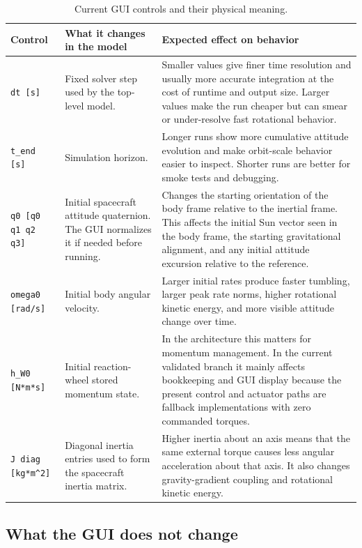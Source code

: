\documentclass[11pt]{article}
\begin{document}
\begin{table}[H]
\centering
\begin{tabularx}{\textwidth}{@{}lY Y@{}}
\toprule
\textbf{Control} & \textbf{What it changes in the model} & \textbf{Expected effect on behavior} \\
\midrule
\texttt{dt [s]} & Fixed solver step used by the top-level model. & Smaller values give finer time resolution and usually more accurate integration at the cost of runtime and output size. Larger values make the run cheaper but can smear or under-resolve fast rotational behavior. \\
\texttt{t\_end [s]} & Simulation horizon. & Longer runs show more cumulative attitude evolution and make orbit-scale behavior easier to inspect. Shorter runs are better for smoke tests and debugging. \\
\texttt{q0 [q0 q1 q2 q3]} & Initial spacecraft attitude quaternion. The GUI normalizes it if needed before running. & Changes the starting orientation of the body frame relative to the inertial frame. This affects the initial Sun vector seen in the body frame, the starting gravitational alignment, and any initial attitude excursion relative to the reference. \\
\texttt{omega0 [rad/s]} & Initial body angular velocity. & Larger initial rates produce faster tumbling, larger peak rate norms, higher rotational kinetic energy, and more visible attitude change over time. \\
\texttt{h\_W0 [N*m*s]} & Initial reaction-wheel stored momentum state. & In the architecture this matters for momentum management. In the current validated branch it mainly affects bookkeeping and GUI display because the present control and actuator paths are fallback implementations with zero commanded torques. \\
\texttt{J diag [kg*m\textasciicircum 2]} & Diagonal inertia entries used to form the spacecraft inertia matrix. & Higher inertia about an axis means that the same external torque causes less angular acceleration about that axis. It also changes gravity-gradient coupling and rotational kinetic energy. \\
\bottomrule
\end{tabularx}
\caption{Current GUI controls and their physical meaning.}
\label{tab:gui-controls}
\end{table}

\subsection{What the GUI does not change}
\end{document}
